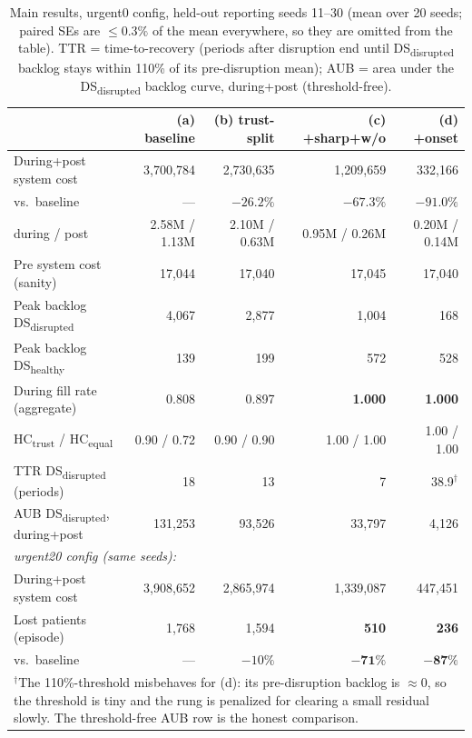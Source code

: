 \documentclass[11pt]{article}
\newcommand{\dsd}{DS\textsubscript{disrupted}}
\newcommand{\dsh}{DS\textsubscript{healthy}}
\newcommand{\hct}{HC\textsubscript{trust}}
\newcommand{\hce}{HC\textsubscript{equal}}
\begin{document}
\begin{table}[h]
\centering\small
\caption{Main results, urgent0 config, held-out reporting seeds 11--30 (mean over 20 seeds;
paired SEs are $\le 0.3\%$ of the mean everywhere, so they are omitted from the table).
TTR = time-to-recovery (periods after disruption end until \dsd{} backlog stays within 110\%
of its pre-disruption mean); AUB = area under the \dsd{} backlog curve, during+post
(threshold-free).}
\begin{tabular}{lrrrr}
\toprule
& \textbf{(a) baseline} & \textbf{(b) trust-split} & \textbf{(c) +sharp+w/o} & \textbf{(d) +onset} \\
\midrule
During+post system cost & 3{,}700{,}784 & 2{,}730{,}635 & 1{,}209{,}659 & 332{,}166 \\
\quad vs.\ baseline & --- & $\mathbf{-26.2\%}$ & $\mathbf{-67.3\%}$ & $\mathbf{-91.0\%}$ \\
\quad during / post & 2.58M / 1.13M & 2.10M / 0.63M & 0.95M / 0.26M & 0.20M / 0.14M \\
Pre system cost (sanity) & 17{,}044 & 17{,}040 & 17{,}045 & 17{,}040 \\
Peak backlog \dsd{} & 4{,}067 & 2{,}877 & 1{,}004 & 168 \\
Peak backlog \dsh{} & 139 & 199 & 572 & 528 \\
During fill rate (aggregate) & 0.808 & 0.897 & \textbf{1.000} & \textbf{1.000} \\
\quad \hct{} / \hce{} & 0.90 / 0.72 & 0.90 / 0.90 & 1.00 / 1.00 & 1.00 / 1.00 \\
TTR \dsd{} (periods) & 18 & 13 & 7 & 38.9$^{\dagger}$ \\
AUB \dsd{}, during+post & 131{,}253 & 93{,}526 & 33{,}797 & 4{,}126 \\
\midrule
\multicolumn{5}{l}{\emph{urgent20 config (same seeds):}} \\
During+post system cost & 3{,}908{,}652 & 2{,}865{,}974 & 1{,}339{,}087 & 447{,}451 \\
Lost patients (episode) & 1{,}768 & 1{,}594 & \textbf{510} & \textbf{236} \\
\quad vs.\ baseline & --- & $-10\%$ & $\mathbf{-71\%}$ & $\mathbf{-87\%}$ \\
\bottomrule
\multicolumn{5}{p{14.5cm}}{\footnotesize $^{\dagger}$The 110\%-threshold misbehaves for (d):
its pre-disruption backlog is $\approx 0$, so the threshold is tiny and the rung is penalized
for clearing a small residual slowly. The threshold-free AUB row is the honest comparison.}
\end{tabular}
\end{table}
\end{document}
